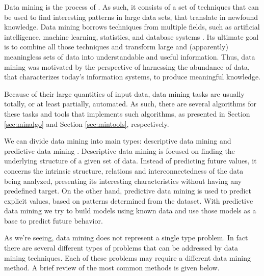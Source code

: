Data mining is the process of  \cite[p. 5]{han2006data}. As such, it consists of a
set of techniques that can be used to find interesting patterns in large data
sets, that translate in newfound knowledge. Data mining borrows techniques from
multiple fields, such as artificial intelligence, machine learning, statistics,
and database systems \cite{Chakrabarti2012}. Its ultimate goal is to combine all
those techniques and transform large and (apparently) meaningless sets of data
into understandable and useful information. Thus, data mining was motivated by
the perspective of harnessing the abundance of data, that characterizes today's
information systems, to produce meaningful knowledge.

Because of their large quantities of input data, data mining tasks are usually
totally, or at least partially, automated. As such, there are several algorithms
for these tasks and tools that implements such algorithms, as presented in
Section \ref{sec:minalgo} and Section \ref{sec:mintools}, respectively.

We can divide data mining into main types: descriptive data mining and
predictive data mining \cite{Fayyad1996}. Descriptive data mining is focused on
finding the underlying structure of a given set of data. Instead of predicting
future values, it concerns the intrinsic structure, relations and
interconnectedness of the data being analyzed, presenting its interesting
characteristics without having any predefined target. On the other hand,
predictive data mining is used to predict explicit values, based on patterns
determined from the dataset. With predictive data mining we try to build models
using known data and use those models as a base to predict future behavior.

As we're seeing, data mining does not represent a single type problem. In fact
there are several different types of problems that can be addressed by data
mining techniques. Each of these problems may require a different data mining
method. A brief review of the most common methods is given below.

